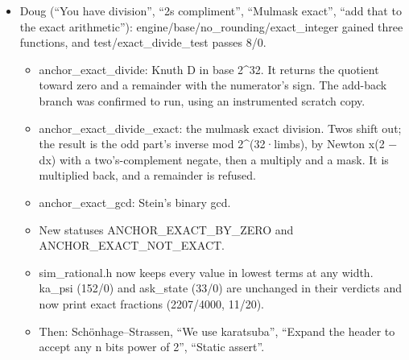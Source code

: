\begin{enumerate}
\begin{itemize}
\begin{itemize}
\item LEMMA 3.4 IS FALSE AT k = 1. ξ(0.1, 0) − ξ(0, 0.9) = 1/10 − (9/10)α₂ = 0.0090999… < γ\textasciicircum{}−2, and the n = 3 analogue gives 9.0998 units. Lemma 3.8's supports (ramp γ\textasciicircum{}−β(k+1)) overlap at k = 1.
\item The proof's break: (3.11), the α cut at r ≤ k, does hold. It measures exactly 10, 50 and 500050 units for n = 2 at k = 1, 2, 3, and 10 and 5000 units for n = 3 at k = 1, 2. But “the tails cannot annihilate it” does not mean “the tails keep it at or above the bound”.
\item Correct: |µ\_\allowbreak{}k| ≥ γ\textasciicircum{}−nβ(k) − Σ\_\allowbreak{}\{p≥2\}ε\_\allowbreak{}\{k,p\}, about (γ−1)u' with u' = γ\textasciicircum{}−β(k+1). That beats the image width (γ−2)b\_\allowbreak{}k ≈ 8.81u' (n = 2) and 8.88u' (n = 3). With ramp ρ = γ\textasciicircum{}−(β(k+1)+2), the supports are disjoint at every k: checked symbolically for k = 1..57 (n = 2) and k = 1..35 (n = 3). The paper's ramp is covered at no k by this bound.
\item Measured from k = 2 the true gaps are far wider (49.5, 500049.5 and 5000 units). The shifts check: m + 1 = 2n + 1 shifts never share a gap; with m + 1 = γ they do.
\end{itemize}
\item Doug (“You have division”, “2s compliment”, “Mulmask exact”, “add that to the exact arithmetic”): engine/base/no\_\allowbreak{}rounding/exact\_\allowbreak{}integer gained three functions, and test/exact\_\allowbreak{}divide\_\allowbreak{}test passes 8/0.

\begin{itemize}
\item anchor\_\allowbreak{}exact\_\allowbreak{}divide: Knuth D in base 2\textasciicircum{}32. It returns the quotient toward zero and a remainder with the numerator's sign. The add-back branch was confirmed to run, using an instrumented scratch copy.
\item anchor\_\allowbreak{}exact\_\allowbreak{}divide\_\allowbreak{}exact: the mulmask exact division. Twos shift out; the result is the odd part's inverse mod 2\textasciicircum{}(32·limbs), by Newton x(2 − dx) with a two's-complement negate, then a multiply and a mask. It is multiplied back, and a remainder is refused.
\item anchor\_\allowbreak{}exact\_\allowbreak{}gcd: Stein's binary gcd.
\item New statuses ANCHOR\_\allowbreak{}EXACT\_\allowbreak{}BY\_\allowbreak{}ZERO and ANCHOR\_\allowbreak{}EXACT\_\allowbreak{}NOT\_\allowbreak{}EXACT.
\item sim\_\allowbreak{}rational.h now keeps every value in lowest terms at any width. ka\_\allowbreak{}psi (152/0) and ask\_\allowbreak{}state (33/0) are unchanged in their verdicts and now print exact fractions (2207/4000, 11/20).
\item Then: Schönhage–Strassen, “We use karatsuba”, “Expand the header to accept any n bits power of 2”, “Static assert”.


\end{itemize}
\end{itemize}
\end{enumerate}
